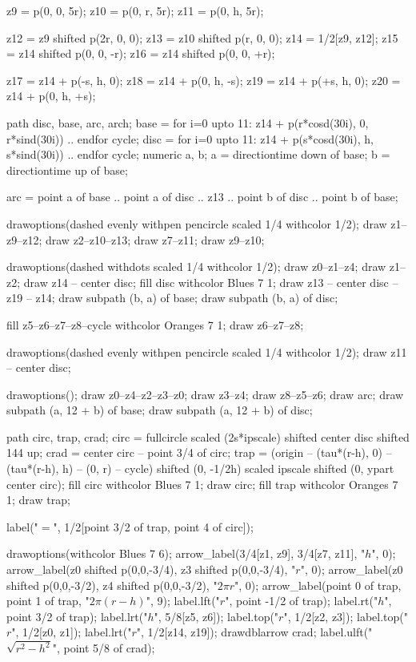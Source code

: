 \documentclass[oneside]{scrbook}
\begin{document}
 z9 = p(0, 0, 5r);
z10 = p(0, r, 5r);
z11 = p(0, h, 5r);

z12 = z9 shifted p(2r, 0, 0);
z13 = z10 shifted p(r, 0, 0);
z14 = 1/2[z9, z12];
z15 = z14 shifted p(0, 0, -r);
z16 = z14 shifted p(0, 0, +r);

z17 = z14 + p(-s, h, 0);
z18 = z14 + p(0, h, -s);
z19 = z14 + p(+s, h, 0);
z20 = z14 + p(0, h, +s);

path disc, base, arc, arch; 
base = for i=0 upto 11: z14 + p(r*cosd(30i), 0, r*sind(30i)) .. endfor cycle;
disc = for i=0 upto 11: z14 + p(s*cosd(30i), h, s*sind(30i)) .. endfor cycle;
numeric a, b;
a = directiontime down of base;
b = directiontime up of base;

arc = point a of base .. point a of disc .. z13 .. point b of disc .. point b of base;

drawoptions(dashed evenly withpen pencircle scaled 1/4 withcolor 1/2);
draw z1--z9--z12; draw z2--z10--z13; draw z7--z11;
draw z9--z10;

drawoptions(dashed withdots scaled 1/4 withcolor 1/2);
draw z0--z1--z4; draw z1--z2; 
draw z14 -- center disc;
fill disc withcolor Blues 7 1;
draw z13 -- center disc -- z19 -- z14;
draw subpath (b, a) of base;
draw subpath (b, a) of disc;

fill z5--z6--z7--z8--cycle withcolor Oranges 7 1;
draw z6--z7--z8;

drawoptions(dashed evenly withpen pencircle scaled 1/4 withcolor 1/2);
draw z11 -- center disc;

drawoptions();
draw z0--z4--z2--z3--z0; draw z3--z4; draw z8--z5--z6;
draw arc;
draw subpath (a, 12 + b) of base;
draw subpath (a, 12 + b) of disc;

path circ, trap, crad;
circ = fullcircle scaled (2s*ipscale) shifted center disc shifted 144 up;
crad = center circ -- point 3/4 of circ;
trap = (origin -- (tau*(r-h), 0) -- (tau*(r-h), h) -- (0, r) -- cycle) 
     shifted (0, -1/2h)
     scaled ipscale shifted (0, ypart center circ);
fill circ withcolor Blues 7 1;  
draw circ;
fill trap withcolor Oranges 7 1; draw trap;

label("${}={}$", 1/2[point 3/2 of trap, point 4 of circ]); 

drawoptions(withcolor Blues 7 6);
arrow_label(3/4[z1, z9], 3/4[z7, z11], "$h$", 0);
arrow_label(z0 shifted p(0,0,-3/4), z3 shifted p(0,0,-3/4), "$r$", 0);
arrow_label(z0 shifted p(0,0,-3/2), z4 shifted p(0,0,-3/2), "$2\pi r$", 0);
arrow_label(point 0 of trap, point 1 of trap, "$2\pi(r-h)$", 9);
label.lft("$r$", point -1/2 of trap);
label.rt("$h$", point 3/2 of trap);
label.lrt("$h$", 5/8[z5, z6]);
label.top("$r$", 1/2[z2, z3]);
label.top("$r$", 1/2[z0, z1]);
label.lrt("$r$", 1/2[z14, z19]);
drawdblarrow crad;
label.ulft("$\sqrt{r^2-h^2}$", point 5/8 of crad);
\end{document}
